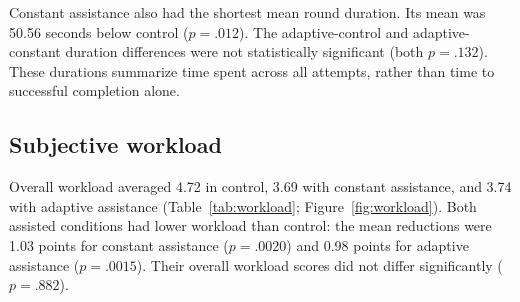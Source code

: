 \documentclass[sigconf,anonymous,balance=false]{aamas}
\begin{document}
Constant assistance also had the shortest mean round duration. Its mean was 50.56 seconds below control ($p=.012$). The adaptive-control and adaptive-constant duration differences were not statistically significant (both $p=.132$). These durations summarize time spent across all attempts, rather than time to successful completion alone.


\subsection{Subjective workload}

Overall workload averaged 4.72 in control, 3.69 with constant assistance, and 3.74 with adaptive assistance (Table~\ref{tab:workload}; Figure~\ref{fig:workload}). Both assisted conditions had lower workload than control: the mean reductions were 1.03 points for constant assistance ($p=.0020$) and 0.98 points for adaptive assistance ($p=.0015$). Their overall workload scores did not differ significantly ($p=.882$).
\end{document}
